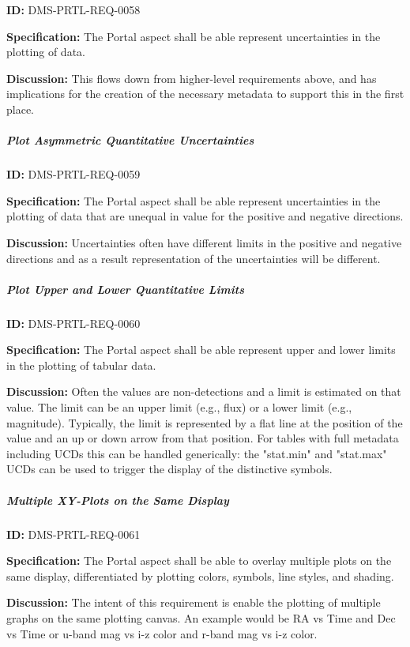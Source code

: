 \documentclass[SE,toc,lsstdraft]{lsstdoc}
\begin{document}
\label{DMS-PRTL-REQ-0058}
\textbf{ID:} DMS-PRTL-REQ-0058

\textbf{Specification:}
The Portal aspect shall be able represent uncertainties in the plotting of data.

\textbf{Discussion:}
This flows down from higher-level requirements above, and has implications for the creation of the necessary metadata to support this in the first place.

\subparagraph{Plot Asymmetric Quantitative Uncertainties}\hfill  %

\label{DMS-PRTL-REQ-0059}
\textbf{ID:} DMS-PRTL-REQ-0059

\textbf{Specification:}
The Portal aspect shall be able represent uncertainties in the plotting of data that are unequal in value for the positive and negative directions.

\textbf{Discussion:}
Uncertainties often have different limits in the positive and negative directions and as a result representation of the uncertainties will be different.

\subparagraph{Plot Upper and Lower Quantitative Limits}\hfill  %

\label{DMS-PRTL-REQ-0060}
\textbf{ID:} DMS-PRTL-REQ-0060

\textbf{Specification:}
The Portal aspect shall be able represent upper and lower limits in the plotting of tabular data.

\textbf{Discussion:}
Often the values are non-detections and a limit is estimated on that value.  The limit can be an upper limit (e.g., flux) or a lower limit (e.g., magnitude).  Typically, the limit is represented by a flat line at the position of the value and an up or down arrow from that position.
For tables with full metadata including UCDs this can be handled generically: the "stat.min" and "stat.max" UCDs can be used to trigger the display of the distinctive symbols.

\subparagraph{Multiple XY-Plots on the Same Display}\hfill  %

\label{DMS-PRTL-REQ-0061}
\textbf{ID:} DMS-PRTL-REQ-0061

\textbf{Specification:}
The Portal aspect shall be able to overlay multiple plots on the same display, differentiated by plotting colors, symbols, line styles, and shading.

\textbf{Discussion:}
The intent of this requirement is enable the plotting of multiple graphs on the same plotting canvas.  An example would be RA vs Time and Dec vs Time or u-band mag vs i-z color and r-band mag vs i-z color.
\end{document}

